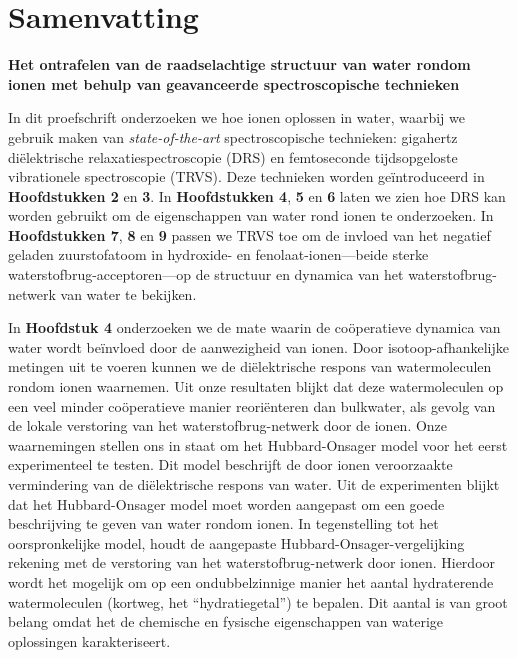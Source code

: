 
\chapter*{Samenvatting}



\begin{center}
	\textcolor{SchoolColor}{\Titulosize\bfseries Het ontrafelen van de raadselachtige structuur van water rondom ionen met behulp van geavanceerde spectroscopische technieken} \normalsize \\
	\vspace*{9pt}
\end{center}


In dit proefschrift onderzoeken we hoe ionen oplossen in water, waarbij we gebruik maken van \textit{state-of-the-art} spectroscopische technieken: gigahertz di\"{e}lektrische relaxatiespectroscopie (DRS) en femtoseconde tijdsopgeloste vibrationele spectroscopie (TRVS). Deze technieken worden ge\"{i}ntroduceerd in \textbf{Hoofdstukken 2} en \textbf{3}. In \textbf {Hoofdstukken 4}, \textbf{5} en \textbf{6} laten we zien hoe DRS kan worden gebruikt om de eigenschappen van water rond ionen te onderzoeken. In \textbf{Hoofdstukken 7}, \textbf{8} en \textbf{9} passen we TRVS toe om de invloed van het negatief geladen zuurstofatoom in hydroxide- en fenolaat-ionen---beide sterke waterstofbrug-acceptoren---op de structuur en dynamica van het waterstofbrug-netwerk van water te bekijken.


In \textbf{Hoofdstuk 4} onderzoeken we de mate waarin de co\"{o}peratieve dynamica van water wordt be\"{i}nvloed door de aanwezigheid van ionen. Door isotoop-afhankelijke metingen uit te voeren kunnen we de di\"{e}lektrische respons van watermoleculen rondom ionen waarnemen. Uit onze resultaten blijkt dat deze watermoleculen op een veel minder co\"{o}peratieve manier reori\"{e}nteren dan bulkwater, als gevolg van de lokale verstoring van het waterstofbrug-netwerk door de ionen. Onze waarnemingen stellen ons in staat om het Hubbard-Onsager model voor het eerst experimenteel te testen. Dit model beschrijft de door ionen veroorzaakte vermindering van de di\"{e}lektrische respons van water. Uit de experimenten blijkt dat het Hubbard-Onsager model moet worden aangepast om een goede beschrijving te geven van water rondom ionen. In tegenstelling tot het oorspronkelijke model, houdt de aangepaste Hubbard-Onsager-vergelijking rekening met de verstoring van het waterstofbrug-netwerk door ionen. Hierdoor wordt het mogelijk om op een ondubbelzinnige manier het aantal hydraterende watermoleculen (kortweg, het ``hydratiegetal'') te bepalen. Dit aantal is van groot belang omdat het de chemische en fysische eigenschappen van waterige oplossingen karakteriseert.


